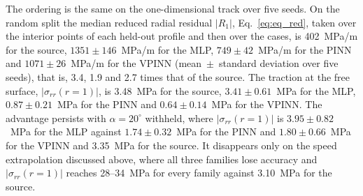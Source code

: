 The ordering is the same on the one-dimensional track over five seeds.
On the random split the median reduced radial residual $|R_1|$, Eq.~\eqref{eq:eq_red}, taken over the interior points of each held-out profile and then over the cases, is 402~MPa/m for the source, $1351\pm146$~MPa/m for the MLP, $749\pm42$~MPa/m for the PINN and $1071\pm26$~MPa/m for the VPINN (mean~$\pm$~standard deviation over five seeds), that is, 3.4, 1.9 and 2.7 times that of the source. The traction at the free surface, $|\sigma_{rr}(r{=}1)|$, is 3.48~MPa for the source, $3.41\pm0.61$~MPa for the MLP, $0.87\pm0.21$~MPa for the PINN and $0.64\pm0.14$~MPa for the VPINN. The advantage persists with $\alpha=20^\circ$ withheld, where $|\sigma_{rr}(r{=}1)|$ is $3.95\pm0.82$~MPa for the MLP against $1.74\pm0.32$~MPa for the PINN and $1.80\pm0.66$~MPa for the VPINN and 3.35~MPa for the source. It disappears only on the speed extrapolation discussed above, where all three families lose accuracy and $|\sigma_{rr}(r{=}1)|$ reaches 28--34~MPa for every family against 3.10~MPa for the source. %


